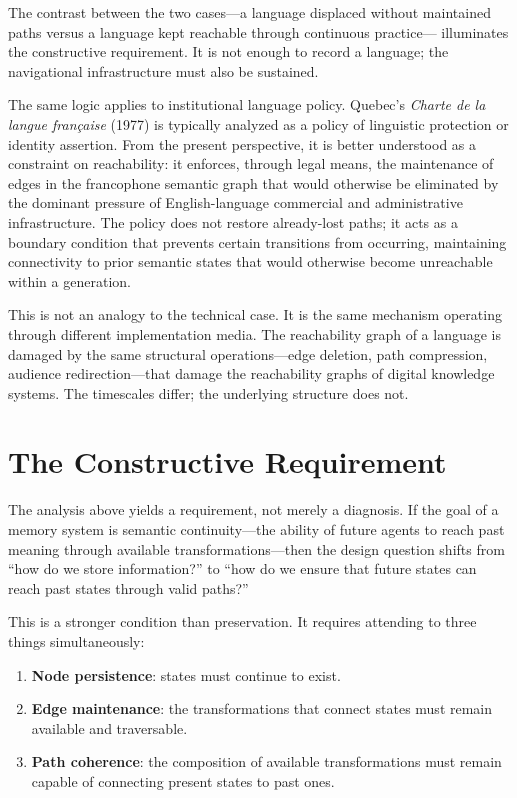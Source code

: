 \documentclass[12pt]{article}
\begin{document}
The contrast between the two cases---a language displaced without maintained
paths versus a language kept reachable through continuous practice---
illuminates the constructive requirement.
It is not enough to record a language; the navigational infrastructure must
also be sustained.

The same logic applies to institutional language policy.
Quebec's \emph{Charte de la langue fran\c{c}aise} (1977) is typically analyzed
as a policy of linguistic protection or identity assertion.
From the present perspective, it is better understood as a constraint on
reachability: it enforces, through legal means, the maintenance of edges in
the francophone semantic graph that would otherwise be eliminated by
the dominant pressure of English-language commercial and administrative
infrastructure.
The policy does not restore already-lost paths; it acts as a boundary
condition that prevents certain transitions from occurring, maintaining
connectivity to prior semantic states that would otherwise become
unreachable within a generation.

This is not an analogy to the technical case.
It is the same mechanism operating through different implementation media.
The reachability graph of a language is damaged by the same structural
operations---edge deletion, path compression, audience redirection---that
damage the reachability graphs of digital knowledge systems.
The timescales differ; the underlying structure does not.

\section{The Constructive Requirement}

The analysis above yields a requirement, not merely a diagnosis.
If the goal of a memory system is semantic continuity---the ability of future
agents to reach past meaning through available transformations---then the
design question shifts from ``how do we store information?'' to ``how do we
ensure that future states can reach past states through valid paths?''

This is a stronger condition than preservation.
It requires attending to three things simultaneously:

\begin{enumerate}[leftmargin=2em,itemsep=0.2em]
  \item \textbf{Node persistence}: states must continue to exist.
  \item \textbf{Edge maintenance}: the transformations that connect states must
        remain available and traversable.
  \item \textbf{Path coherence}: the composition of available transformations
        must remain capable of connecting present states to past ones.
\end{enumerate}
\end{document}
